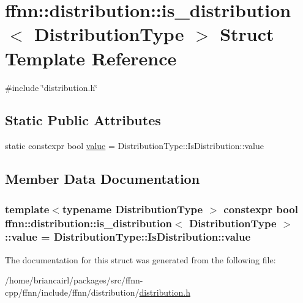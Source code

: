 \hypertarget{structffnn_1_1distribution_1_1is__distribution}{\section{ffnn\-:\-:distribution\-:\-:is\-\_\-distribution$<$ Distribution\-Type $>$ Struct Template Reference}
\label{structffnn_1_1distribution_1_1is__distribution}
}


{\ttfamily \#include \char`\"{}distribution.\-h\char`\"{}}

\subsection*{Static Public Attributes}
\begin{DoxyCompactItemize}
\item 
static constexpr bool \hyperlink{structffnn_1_1distribution_1_1is__distribution_ae453bad90168b9fdd2dc5ad9d86523de}{value} = Distribution\-Type\-::\-Is\-Distribution\-::value
\end{DoxyCompactItemize}


\subsection{Member Data Documentation}
\hypertarget{structffnn_1_1distribution_1_1is__distribution_ae453bad90168b9fdd2dc5ad9d86523de}{
\subsubsection[{value}]{\setlength{\rightskip}{0pt plus 5cm}template$<$typename Distribution\-Type $>$ constexpr bool {\bf ffnn\-::distribution\-::is\-\_\-distribution}$<$ Distribution\-Type $>$\-::value = Distribution\-Type\-::\-Is\-Distribution\-::value\hspace{0.3cm}{\ttfamily [static]}}}\label{structffnn_1_1distribution_1_1is__distribution_ae453bad90168b9fdd2dc5ad9d86523de}


The documentation for this struct was generated from the following file\-:\begin{DoxyCompactItemize}
\item 
/home/briancairl/packages/src/ffnn-\/cpp/ffnn/include/ffnn/distribution/\hyperlink{distribution_8h}{distribution.\-h}\end{DoxyCompactItemize}
